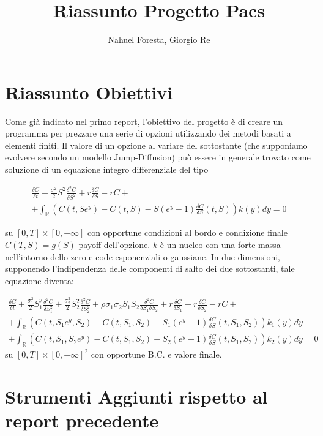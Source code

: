 \documentclass[a4paper,10pt]{article}
\title{Riassunto Progetto Pacs}
\author{Nahuel Foresta, Giorgio Re}
\newcommand{\der}[2]{\frac{\delta #1}{\delta #2}}
\newcommand{\dder}[2]{\frac{\delta^2 #1}{\delta #2^2}}
\newcommand{\dmix}[3]{\frac{\delta^2 #1}{\delta #2 \delta #3}}
\begin{document}
\maketitle

\section{Riassunto Obiettivi}

Come gi\`a indicato nel primo report, l'obiettivo del progetto è di creare un programma per prezzare una serie di opzioni utilizzando dei metodi basati a elementi finiti. Il valore di un opzione al variare del sottostante (che supponiamo evolvere secondo un modello Jump-Diffusion) può essere in generale trovato come soluzione di un equazione integro differenziale del tipo

\begin{multline}
\der{C}{t}+\frac{\sigma^2}{2}S^2\dder{C}{S}+r\der{C}{S}-rC+\\+ \int_\mathbb{R}\left(C(t,Se^y)-C(t,S)-S(e^y-1)\der{C}{S}(t,S)\right)k(y)dy=0
\label{eq:1d}
\end{multline}

su $[0,T]\times[0,+\infty]$ con opportune condizioni al bordo e condizione finale $C(T,S)=g(S)$ payoff dell'opzione. $k$ è un nucleo con una forte massa nell'intorno dello zero e code esponenziali o gaussiane.
In due dimensioni, supponendo l'indipendenza delle componenti di salto dei due sottostanti, tale equazione diventa:


\begin{multline}
 \der{C}{t}+\frac{\sigma_1^2}{2}S_1^2\dder{C}{S_1}+\frac{\sigma_2^2}{2}S_2^2\dder{C}{S_2}+\rho\sigma_1\sigma_2 S_1 S_2 \dmix{C}{S_1}{S_2}+
 r\der{C}{S_1}+r\der{C}{S_2}-rC+ \\
 + \int_\mathbb{R}\left(C(t,S_1e^{y},S_2)-C(t,S_1,S_2)-S_1(e^y-1)\der{C}{S}(t,S_1,S_2)\right)k_1(y)dy\\
 + \int_\mathbb{R}\left(C(t,S_1,S_2e^{y})-C(t,S_1,S_2)-S_2(e^y-1)\der{C}{S}(t,S_1,S_2)\right)k_2(y)dy=0
\label{eq:2d}
\end{multline}
su $[0,T]\times[0,+\infty]^2$ con opportune B.C. e valore finale.

\section{Strumenti Aggiunti rispetto al report precedente}
\end{document}
